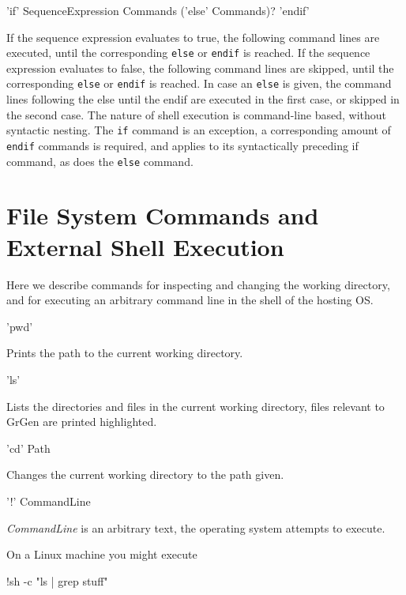 \begin{rail}
  'if' SequenceExpression Commands ('else' Commands)? 'endif'
\end{rail}
If the sequence expression evaluates to true, the following command lines are executed, until the corresponding \texttt{else} or \texttt{endif} is reached.
If the sequence expression evaluates to false, the following command lines are skipped, until the corresponding \texttt{else} or \texttt{endif} is reached. 
In case an \texttt{else} is given, the command lines following the else until the endif are executed in the first case, or skipped in the second case.
The nature of shell execution is command-line based, without syntactic nesting.
The \texttt{if} command is an exception, a corresponding amount of \texttt{endif} commands is required, and applies to its syntactically preceding if command, as does the \texttt{else} command. 


\section{File System Commands and External Shell Execution}
\label{filesyscommandsextex}

Here we describe commands for inspecting and changing the working directory, and for executing an arbitrary command line in the shell of the hosting OS.

\begin{rail}
  'pwd'
\end{rail}
Prints the path to the current working directory.

\begin{rail}
  'ls'
\end{rail}
Lists the directories and files in the current working directory, files relevant to GrGen are printed highlighted.

\begin{rail}
  'cd' Path
\end{rail}
Changes the current working directory to the path given.

\begin{rail}
  '!' CommandLine
\end{rail}
\emph{CommandLine} is an arbitrary text, the operating system attempts to execute.
\begin{example}
On a Linux machine you might execute
\begin{grshell}
!sh -c "ls | grep stuff"
\end{grshell}
\end{example}


